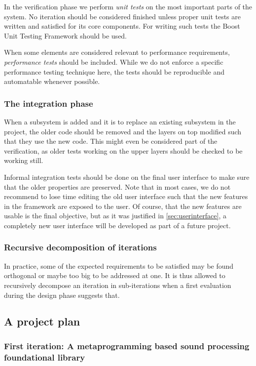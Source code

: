 In the verification phase we perform \emph{unit tests} on the most
important parts of the system. No iteration should be considered
finished unless proper unit tests are written and satisfied for its
core components. For writing such tests the Boost Unit Testing
Framework should be used.

When some elements are considered relevant to performance
requirements, \emph{performance tests} should be included. While we do
not enforce a specific performance testing technique here, the
tests should be reproducible and automatable whenever possible.

\subsubsection{The integration phase}

When a subsystem is added and it is to replace an existing subsystem
in the project, the older code should be removed and the layers on top
modified such that they use the new code. This might even be
considered part of the verification, as older tests working on the
upper layers should be checked to be working still.

Informal integration tests should be done on the final user interface
to make sure that the older properties are preserved. Note that in
most cases, we do not recommend to lose time editing the old user
interface such that the new features in the framework are exposed to
the user. Of course, that the new features are usable is the final
objective, but as it was justified in \ref{sec:userinterface}, a
completely new user interface will be developed as part of a future
project.

\subsubsection{Recursive decomposition of iterations}

In practice, some of the expected requirements to be satisfied may be
found orthogonal or maybe too big to be addressed at one. It is thus
allowed to recursively decompose an iteration in sub-iterations when a
first evaluation during the design phase suggests that.

\subsection{A project plan}

\subsubsection{First iteration: A metaprogramming based sound
  processing foundational library}

